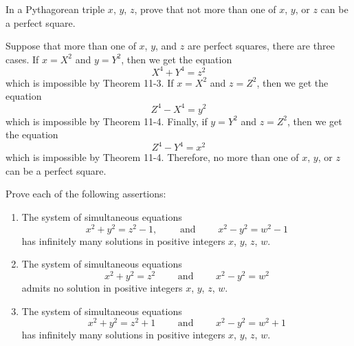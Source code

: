 \begin{exercise}
    In a Pythagorean triple $x$, $y$, $z$, prove that not more than one of $x$, $y$, or $z$ can be a perfect square. \\
\end{exercise}

\begin{solution}
    Suppose that more than one of $x$, $y$, and $z$ are perfect squares, there are three cases. If $x = X^2$ and $y = Y^2$, then we get the equation
    $$X^4 + Y^4 = z^2$$
    which is impossible by Theorem 11-3. If $x = X^2$ and $z = Z^2$, then we get the equation
    $$Z^4 - X^4 = y^2$$
    which is impossible by Theorem 11-4. Finally, if $y = Y^2$ and $z = Z^2$, then we get the equation
    $$Z^4 - Y^4 = x^2$$
    which is impossible by Theorem 11-4. Therefore, no more than one of $x$, $y$, or $z$ can be a perfect square. \\
\end{solution}

\begin{exercise}
    Prove each of the following assertions:
    \begin{enumerate}
        \item The system of simultaneous equations
        $$x^2 + y^2 = z^2 - 1, \qquad \text{ and } \qquad x^2 - y^2 = w^2 - 1$$
        has infinitely many solutions in positive integers $x$, $y$, $z$, $w$. 
        \item The system of simultaneous equations
        $$x^2 + y^2 = z^2 \qquad \text{ and } \qquad x^2 - y^2 = w^2$$
        admits no solution in positive integers $x$, $y$, $z$, $w$.
        \item The system of simultaneous equations
        $$x^2 + y^2 = z^2 + 1\qquad \text{ and } \qquad x^2 - y^2 = w^2 + 1$$
        has infinitely many solutions in positive integers $x$, $y$, $z$, $w$.  \\
    \end{enumerate}
\end{exercise}

